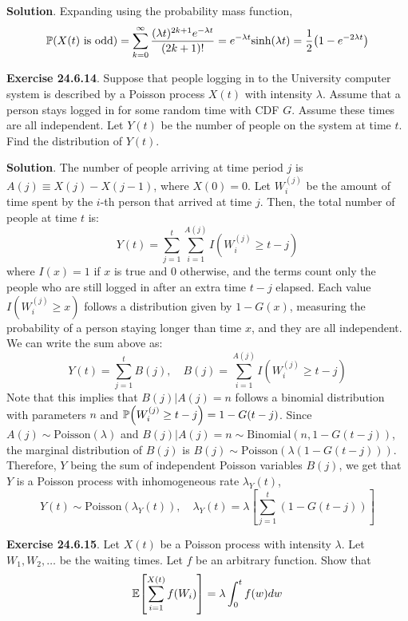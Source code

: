 \textbf{Solution}. Expanding using the probability mass function,
\[
\PROB(X(t) \text{ is odd}) = \sum_{k=0}^{\infty} \frac{(\lambda t)^{2k + 1} e^{-\lambda t}}{(2k + 1)!} = e^{-\lambda t} \text{sinh} (\lambda t) = \frac{1}{2}\left( 1 - e^{-2 \lambda t}\right)
\]

\textbf{Exercise 24.6.14}. Suppose that people logging in to the
University computer system is described by a Poisson process \(X(t)\)
with intensity \(\lambda\). Assume that a person stays logged in for
some random time with CDF \(G\). Assume these times are all independent.
Let \(Y(t)\) be the number of people on the system at time \(t\). Find
the distribution of \(Y(t)\).

\textbf{Solution}.
The number of people arriving at time period \(j\) is
\(A(j) \equiv X(j) - X(j-1)\), where \(X(0) = 0\). Let \(W_{i}^{(j)}\) be
the amount of time spent by the \(i\)-th person that arrived at time
\(j\). Then, the total number of people at time \(t\) is:
\[
Y(t) = \sum_{j=1}^t \sum_{i=1}^{A(j)} I\left(W_{i}^{(j)} \geq t - j\right)
\]
where \(I(x) = 1\) if \(x\) is true and \(0\) otherwise, and the terms
count only the people who are still logged in after an extra time
\(t - j\) elapsed.
Each value \(I\left(W_{i}^{(j)} \geq x\right)\) follows a distribution
given by \(1 - G(x)\), measuring the probability of a person staying
longer than time \(x\), and they are all independent.
We can write the sum above as:
\[
Y(t) = \sum_{j=1}^t B(j), \quad B(j) =\sum_{i = 1}^{A(j)} I\left(W_{i}^{(j)} \geq t - j\right)
\]
Note that this implies that \(B(j) | A(j) = n\) follows a binomial
distribution with parameters \(n\) and
\(\PROB\left(W_{i}^{(j)} \geq t - j \right) = 1 - G(t - j)\).
Since \(A(j) \sim \text{Poisson}(\lambda)\) and
\(B(j) | A(j) = n \sim \text{Binomial}(n, 1 - G(t - j))\), the marginal
distribution of \(B(j)\) is
\(B(j) \sim \text{Poisson}\left(\lambda (1 - G(t - j))\right)\).
Therefore, \(Y\) being the sum of independent Poisson variables
\(B(j)\), we get that \(Y\) is a Poisson process with inhomogeneous rate
\(\lambda_Y(t)\),
\[
Y(t) \sim \text{Poisson}\left( \lambda_Y(t) \right), \quad \lambda_Y(t) = \lambda \left[ \sum_{j=1}^t(1 - G(t - j)) \right]
\]

\textbf{Exercise 24.6.15}. Let \(X(t)\) be a Poisson process with
intensity \(\lambda\). Let \(W_{1}, W_{2}, \dots\) be the waiting times. Let
\(f\) be an arbitrary function. Show that
\[
\EXP \left[ \sum_{i=1}^{X(t)} f(W_{i}) \right] = \lambda \int_{0}^t f(w) dw
\]


